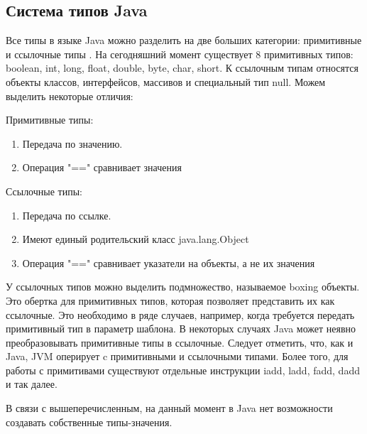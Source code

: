 \subsection{Система типов Java}
Все типы в языке Java можно разделить на две больших категории: примитивные и ссылочные типы \cite{java-spec}. На сегодняшний момент существует 8 примитивных типов: boolean, int,
long, float, double, byte, char, short. К ссылочным типам относятся объекты классов, интерфейсов, массивов и специальный тип null. Можем выделить некоторые отличия:
\par
Примитивные типы:
\begin{enumerate}
	\item Передача по значению.
	\item Операция "==" сравнивает значения 
\end{enumerate}
Ссылочные типы:
\begin{enumerate}
	\item Передача по ссылке.
	\item Имеют единый родительский класс java.lang.Object
	\item Операция "==" сравнивает указатели на объекты, а не их значения
\end{enumerate}
У ссылочных типов можно выделить подмножество, называемое boxing объекты. Это обертка для примитивных типов, которая позволяет представить их как ссылочные. Это необходимо в ряде случаев, например, когда требуется передать примитивный тип в параметр шаблона. В некоторых случаях Java может неявно преобразовывать примитивные типы в ссылочные.
Следует отметить, что, как и Java, JVM оперирует c примитивными и ссылочными типами\cite{jvm-spec}. Более того, для работы с примитивами существуют отдельные инструкции iadd, ladd, fadd, dadd и так далее.
\par
В связи с вышеперечисленным, на данный момент в Java нет возможности создавать собственные типы-значения.

\clearpage
